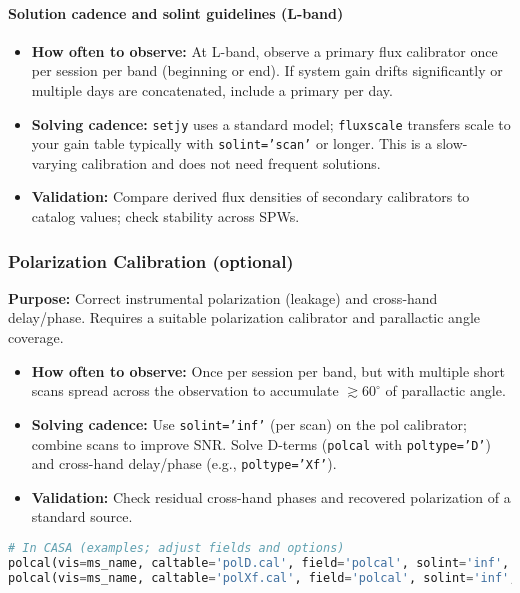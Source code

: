 \documentclass[11pt]{article}
\begin{document}
\paragraph{Solution cadence and solint guidelines (L-band)}
\begin{itemize}
    \item \textbf{How often to observe:} At L-band, observe a primary flux calibrator once per session per band (beginning or end). If system gain drifts significantly or multiple days are concatenated, include a primary per day.
    \item \textbf{Solving cadence:} \texttt{setjy} uses a standard model; \texttt{fluxscale} transfers scale to your gain table typically with \texttt{solint='scan'} or longer. This is a slow-varying calibration and does not need frequent solutions.
    \item \textbf{Validation:} Compare derived flux densities of secondary calibrators to catalog values; check stability across SPWs.
\end{itemize}

\subsubsection{Polarization Calibration (optional)}
\textbf{Purpose:} Correct instrumental polarization (leakage) and cross-hand delay/phase. Requires a suitable polarization calibrator and parallactic angle coverage.
\begin{itemize}
    \item \textbf{How often to observe:} Once per session per band, but with multiple short scans spread across the observation to accumulate \(\gtrsim 60^\circ\) of parallactic angle.
    \item \textbf{Solving cadence:} Use \texttt{solint='inf'} (per scan) on the pol calibrator; combine scans to improve SNR. Solve D-terms (\texttt{polcal} with \texttt{poltype='D'}) and cross-hand delay/phase (e.g., \texttt{poltype='Xf'}).
    \item \textbf{Validation:} Check residual cross-hand phases and recovered polarization of a standard source.
\end{itemize}
\begin{lstlisting}[language=Python]
# In CASA (examples; adjust fields and options)
polcal(vis=ms_name, caltable='polD.cal', field='polcal', solint='inf', poltype='D')
polcal(vis=ms_name, caltable='polXf.cal', field='polcal', solint='inf', poltype='Xf')
\end{lstlisting}
\end{document}
